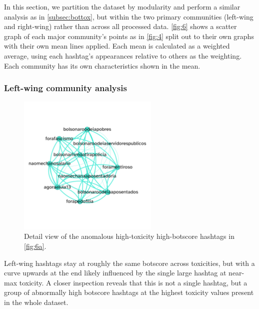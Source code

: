 \documentclass[a4paper,11pt]{article}  %
\begin{document}
	In this section, we partition the dataset by modularity and perform a similar analysis as in \autoref{subsec:bottox}, but within the two primary communities (left-wing and right-wing) rather than across all processed data. \autoref{fig:6} shows a scatter graph of each major community's points as in \autoref{fig:4} split out to their own graphs with their own mean lines applied. Each mean is calculated as a weighted average, using each hashtag's appearances relative to others as the weighting.
	Each community has its own characteristics shown in the mean.

	\subsubsection{Left-wing community analysis}
	
	\begin{figure}%
		\begin{center}
			\includegraphics[width=0.6\textwidth]{images/net_leftwing_hightox_highbot}
		\end{center}
		\caption{Detail view of the anomalous high-toxicity high-botscore hashtags in \autoref{fig:6a}.}
		\label{fig:7}
	\end{figure}

	Left-wing hashtags stay at roughly the same botscore across toxicities, but with a curve upwards at the end likely influenced by the single large hashtag at near-max toxicity. A closer inspection reveals that this is not a single hashtag, but a group of abnormally high botscore hashtags at the highest toxicity values present in the whole dataset. 
	
\end{document}
